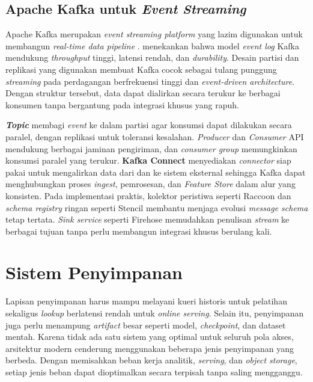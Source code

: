 \subsection{Apache Kafka untuk \textit{Event Streaming}}
\label{sec:kafka}

Apache Kafka merupakan \textit{event streaming platform} yang lazim digunakan untuk membangun \textit{real-time data pipeline} \autocite{apachekafka2024}. \textcite{kleppmann2017ddia} menekankan bahwa model \textit{event log} Kafka mendukung \textit{throughput} tinggi, latensi rendah, dan \textit{durability}. Desain partisi dan replikasi yang digunakan membuat Kafka cocok sebagai tulang punggung \textit{streaming} pada perdagangan berfrekuensi tinggi dan \textit{event-driven architecture}. Dengan struktur tersebut, data dapat dialirkan secara terukur ke berbagai konsumen tanpa bergantung pada integrasi khusus yang rapuh.

\textbf{\textit{Topic}} membagi \textit{event} ke dalam partisi agar konsumsi dapat dilakukan secara paralel, dengan replikasi untuk toleransi kesalahan. \textit{Producer} dan \textit{Consumer} API mendukung berbagai jaminan pengiriman, dan \textit{consumer group} memungkinkan konsumsi paralel yang terukur. \textbf{Kafka Connect} menyediakan \textit{connector} siap pakai untuk mengalirkan data dari dan ke sistem eksternal sehingga Kafka dapat menghubungkan proses \textit{ingest}, pemrosesan, dan \textit{Feature Store} dalam alur yang konsisten. Pada implementasi praktis, kolektor peristiwa seperti Raccoon \autocite{raystack2025raccoon} dan \textit{schema registry} ringan seperti Stencil \autocite{raystack2025stencil} membantu menjaga evolusi \textit{message schema} tetap tertata. \textit{Sink service} seperti Firehose \autocite{raystack2025firehose} memudahkan penulisan \textit{stream} ke berbagai tujuan tanpa perlu membangun integrasi khusus berulang kali.

\section{Sistem Penyimpanan}
\label{sec:storage}

Lapisan penyimpanan harus mampu melayani kueri historis untuk pelatihan sekaligus \textit{lookup} berlatensi rendah untuk \textit{online serving}. Selain itu, penyimpanan juga perlu menampung \textit{artifact} besar seperti model, \textit{checkpoint}, dan dataset mentah. Karena tidak ada satu sistem yang optimal untuk seluruh pola akses, arsitektur modern cenderung menggunakan beberapa jenis penyimpanan yang berbeda. Dengan memisahkan beban kerja analitik, \textit{serving}, dan \textit{object storage}, setiap jenis beban dapat dioptimalkan secara terpisah tanpa saling mengganggu.

